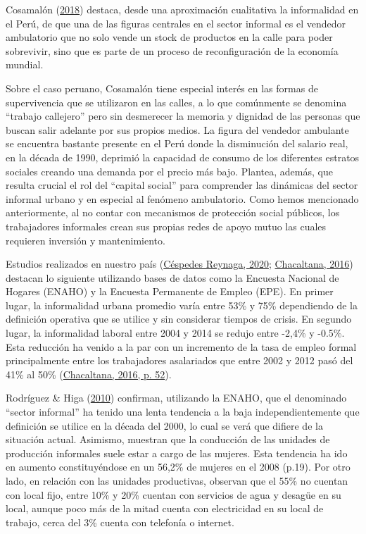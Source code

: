 \documentclass[
  letterpaper,
  12pt,
  oneside,
  spanish,
  doublespacing,
  headsepline,
  parskip]{MastersDoctoralThesis}
\begin{document}
Cosamalón (\protect\hyperlink{ref-cosamaluxf3n2018}{2018}) destaca,
desde una aproximación cualitativa la informalidad en el Perú, de que
una de las figuras centrales en el sector informal es el vendedor
ambulatorio que no solo vende un stock de productos en la calle para
poder sobrevivir, sino que es parte de un proceso de reconfiguración de
la economía mundial.

Sobre el caso peruano, Cosamalón tiene especial interés en las formas de
supervivencia que se utilizaron en las calles, a lo que comúnmente se
denomina ``trabajo callejero'' pero sin desmerecer la memoria y dignidad
de las personas que buscan salir adelante por sus propios medios. La
figura del vendedor ambulante se encuentra bastante presente en el Perú
donde la disminución del salario real, en la década de 1990, deprimió la
capacidad de consumo de los diferentes estratos sociales creando una
demanda por el precio más bajo. Plantea, además, que resulta crucial el
rol del ``capital social'' para comprender las dinámicas del sector
informal urbano y en especial al fenómeno ambulatorio. Como hemos
mencionado anteriormente, al no contar con mecanismos de protección
social públicos, los trabajadores informales crean sus propias redes de
apoyo mutuo las cuales requieren inversión y mantenimiento.

Estudios realizados en nuestro país
(\protect\hyperlink{ref-cuxe9spedesreynaga2020}{Céspedes Reynaga, 2020};
\protect\hyperlink{ref-chacaltana2016}{Chacaltana, 2016}) destacan lo
siguiente utilizando bases de datos como la Encuesta Nacional de Hogares
(ENAHO) y la Encuesta Permanente de Empleo (EPE). En primer lugar, la
informalidad urbana promedio varía entre 53\% y 75\% dependiendo de la
definición operativa que se utilice y sin considerar tiempos de crisis.
En segundo lugar, la informalidad laboral entre 2004 y 2014 se redujo
entre -2,4\% y -0.5\%. Esta reducción ha venido a la par con un
incremento de la tasa de empleo formal principalmente entre los
trabajadores asalariados que entre 2002 y 2012 pasó del 41\% al 50\%
(\protect\hyperlink{ref-chacaltana2016}{Chacaltana, 2016, p. 52}).

Rodríguez \& Higa (\protect\hyperlink{ref-rodruxedguez2010}{2010})
confirman, utilizando la ENAHO, que el denominado ``sector informal'' ha
tenido una lenta tendencia a la baja independientemente que definición
se utilice en la década del 2000, lo cual se verá que difiere de la
situación actual. Asimismo, muestran que la conducción de las unidades
de producción informales suele estar a cargo de las mujeres. Esta
tendencia ha ido en aumento constituyéndose en un 56,2\% de mujeres en
el 2008 (p.19). Por otro lado, en relación con las unidades productivas,
observan que el 55\% no cuentan con local fijo, entre 10\% y 20\%
cuentan con servicios de agua y desagüe en su local, aunque poco más de
la mitad cuenta con electricidad en su local de trabajo, cerca del 3\%
cuenta con telefonía o internet.
\end{document}
